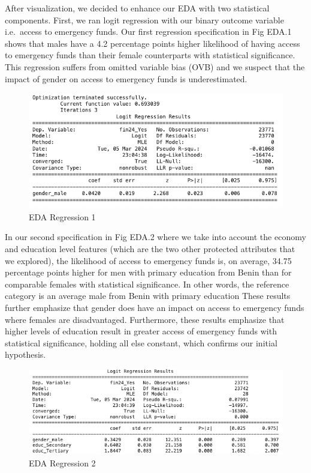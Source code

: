 \documentclass[12pt]{article}
\begin{document}
After visualization, we decided to enhance our EDA with two statistical
components. First, we ran logit regression with our binary outcome
variable i.e.~access to emergency funds. Our first regression
specification in Fig EDA.1 shows that males have a 4.2 percentage points
higher likelihood of having access to emergency funds than their female
counterparts with statistical significance. This regression suffers from
omitted variable bias (OVB) and we suspect that the impact of gender on
access to emergency funds is underestimated.

\begin{figure}

{\centering \includegraphics[width=1\linewidth]{graphs/eda1} 

}

\caption{EDA Regression 1}\label{fig:unnamed-chunk-14}
\end{figure}

In our second specification in Fig EDA.2 where we take into account the
economy and education level features (which are the two other protected
attributes that we explored), the likelihood of access to emergency
funds is, on average, 34.75 percentage points higher for men with
primary education from Benin than for comparable females with
statistical significance. In other words, the reference category is an
average male from Benin with primary education These results further
emphasize that gender does have an impact on access to emergency funds
where females are disadvantaged. Furthermore, these results emphasize
that higher levels of education result in greater access of emergency
funds with statistical significance, holding all else constant, which
confirms our initial hypothesis.

\begin{figure}

{\centering \includegraphics[width=1\linewidth]{graphs/eda2} 

}

\caption{EDA Regression 2}\label{fig:unnamed-chunk-15}
\end{figure}
\end{document}
